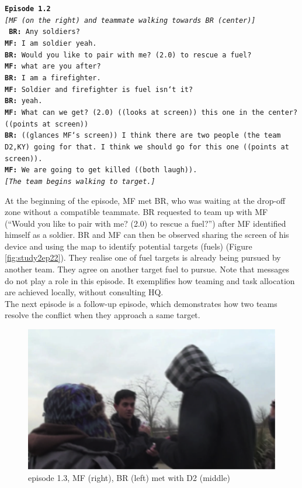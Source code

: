 \noindent\texttt{\textbf{Episode 1.2}\\
\emph{[MF (on the right) and teammate walking towards BR (center)]\\}
\textbf{BR:} Any soldiers?\\
\textbf{MF:} I am soldier yeah.\\
\textbf{BR:} Would you like to pair with me? (2.0) to rescue a fuel?\\
\textbf{MF:} what are you after?\\
\textbf{BR:} I am a firefighter.\\
\textbf{MF:} Soldier and firefighter is fuel isn`t it?\\
\textbf{BR:} yeah.\\
\textbf{MF:} What can we get? (2.0) ((looks at screen)) this one in the center? ((points at screen))\\
\textbf{BR:} ((glances MF`s screen)) I think there are two people (the team D2,KY) going for that. I think we should go for this one ((points at screen)).\\
\textbf{MF:} We are going to get killed ((both laugh)).\\
\emph{[The team begins walking to target.]}\\
}

At the beginning of the episode, MF met BR, who was waiting at the drop-off zone without a compatible teammate. BR requested to team up with MF (``Would you like to pair with me? (2.0) to rescue a fuel?'') after MF identified himself as a soldier. BR and MF can then be observed sharing the screen of his device and using the map to identify potential targets (fuels) (Figure \ref{fig:study2ep22}). They realise one of fuel targets is already being pursued by another team. They agree on another target fuel to pursue. Note that messages do not play a role in this episode. It exemplifies how teaming and task allocation are achieved locally, without consulting HQ. \\

The next episode is a follow-up episode, which demonstrates how two teams resolve the conflict when they approach a same target.\\

\begin{figure}[h]
  \centering
  \includegraphics[width=1\textwidth]{img/study1/ep5/ep51}
  \caption{episode 1.3, MF (right), BR (left) met with D2 (middle)}
  \label{fig:intructions}
\end{figure}

